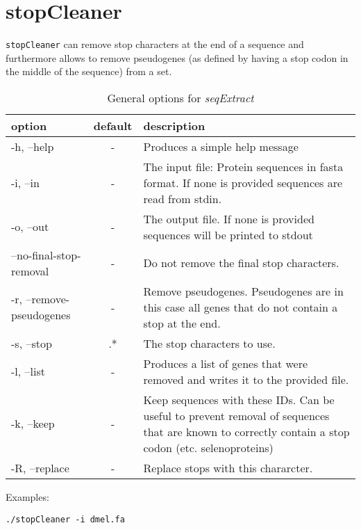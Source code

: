 \chapter{stopCleaner}

\texttt{stopCleaner} can remove stop characters at the end of a sequence and furthermore allows to remove pseudogenes (as defined by having a stop codon in the middle of the sequence) from a set. 

\begin{table}[H]
\caption{General options for \textit{seqExtract}}
\begin{tabular}{lcp{12cm}}\hline
option & default & description\\
\hline
-h, --help & - & Produces a simple help message\\
  -i, --in &-&              The input file: Protein sequences in fasta format. If none is provided sequences are read from stdin.\\
  -o, --out &-&    The output file. If none is provided sequences will be printed to stdout\\
  --no-final-stop-removal  &-&     Do not remove the final stop characters.\\
  -r, --remove-pseudogenes &-&   Remove pseudogenes. Pseudogenes are in this case all genes that do not contain a stop at the end.\\
  -s, --stop   &.*   &      The stop characters to use.\\
  -l, --list  &-&            Produces a list of genes that were removed and writes it to the provided file.\\
  -k, --keep  &-&            Keep sequences with these IDs. Can be useful to prevent removal of sequences that are known to correctly contain a stop codon (etc. selenoproteins)\\
  -R, --replace &-&          Replace stops with this chararcter.\\
  \hline
\end{tabular}
\end{table}


Examples:

\begin{lstlisting}
./stopCleaner -i dmel.fa
\end{lstlisting}